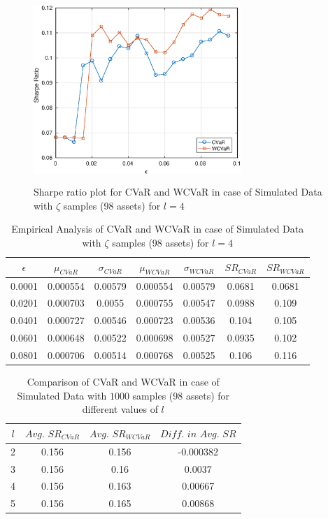 \documentclass[12pt]{article}
\numberwithin{equation}{section}
\begin{document}
\begin{figure}[!h]
\centering
\includegraphics[height=7.0cm,width=0.7\textwidth]{CVaR/bse100_simulated/sr_exact_4.eps}
\caption{Sharpe ratio plot for CVaR and WCVaR in case of Simulated Data with $\zeta$ samples (98 assets) for $l=4$}
\label{fig:6.5}
\end{figure}

\begin{table}[!h]
\centering
\captionsetup{justification=centering}
\begin{tabular}{||c|c|c|c|c|c|c||}
\hline
$\epsilon$ & $\mu_{CVaR}$ & $\sigma_{CVaR}$ & $\mu_{WCVaR}$ & $\sigma_{WCVaR}$ & $SR_{CVaR}$ & $SR_{WCVaR}$\\
\hline
0.0001 & 0.000554 & 0.00579 & 0.000554 & 0.00579 & 0.0681 & 0.0681 \\
0.0201 & 0.000703 & 0.0055 & 0.000755 & 0.00547 & 0.0988 & 0.109 \\
0.0401 & 0.000727 & 0.00546 & 0.000723 & 0.00536 & 0.104 & 0.105 \\
0.0601 & 0.000648 & 0.00522 & 0.000698 & 0.00527 & 0.0935 & 0.102 \\
0.0801 & 0.000706 & 0.00514 & 0.000768 & 0.00525 & 0.106 & 0.116 \\
\hline
\end{tabular}
\caption{Empirical Analysis of CVaR and WCVaR in case of Simulated Data with $\zeta$ samples (98 assets) for $l=4$}
\label{tab:6.5}
\end{table}

\begin{table}[!h]
\centering
\captionsetup{justification=centering}
\begin{tabular}{||c|c|c|c||}
\hline
$l$ & $Avg. \, \, SR_{CVaR}$ & $Avg. \, \, SR_{WCVaR}$ & $Diff. \, \, in \, \, Avg. \, \, SR$ \\
\hline
2 & 0.156 & 0.156 & -0.000382 \\
3 & 0.156 & 0.16 & 0.0037 \\
4 & 0.156 & 0.163 & 0.00667 \\
5 & 0.156 & 0.165 & 0.00868 \\
\hline
\end{tabular}
\caption{Comparison of CVaR and WCVaR in case of Simulated Data with $1000$ samples (98 assets) for different values of $l$}
\label{avgtab:6.6}
\end{table}
\end{document}
